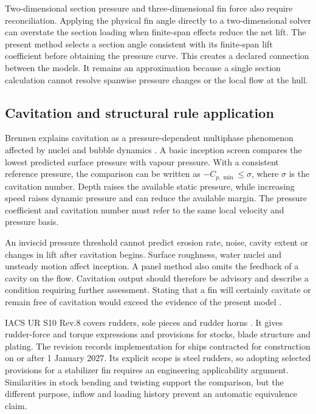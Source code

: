Two-dimensional section pressure and three-dimensional fin force also require reconciliation. Applying the physical fin angle directly to a two-dimensional solver can overstate the section loading when finite-span effects reduce the net lift. The present method selects a section angle consistent with its finite-span lift coefficient before obtaining the pressure curve. This creates a declared connection between the models. It remains an approximation because a single section calculation cannot resolve spanwise pressure changes or the local flow at the hull.

\subsection{Cavitation and structural rule application}
\label{sec:lit-cavitation-rules}

Brennen explains cavitation as a pressure-dependent multiphase phenomenon affected by nuclei and bubble dynamics \cite{brennen1995}. A basic inception screen compares the lowest predicted surface pressure with vapour pressure. With a consistent reference pressure, the comparison can be written as $-C_{p,\min}\leq\sigma$, where $\sigma$ is the cavitation number. Depth raises the available static pressure, while increasing speed raises dynamic pressure and can reduce the available margin. The pressure coefficient and cavitation number must refer to the same local velocity and pressure basis.

An inviscid pressure threshold cannot predict erosion rate, noise, cavity extent or changes in lift after cavitation begins. Surface roughness, water nuclei and unsteady motion affect inception. A panel method also omits the feedback of a cavity on the flow. Cavitation output should therefore be advisory and describe a condition requiring further assessment. Stating that a fin will certainly cavitate or remain free of cavitation would exceed the evidence of the present model \cite{brennen1995,molland2007}.

IACS UR S10 Rev.8 covers rudders, sole pieces and rudder horns \cite{iacsS10}. It gives rudder-force and torque expressions and provisions for stocks, blade structure and plating. The revision records implementation for ships contracted for construction on or after 1 January 2027. Its explicit scope is steel rudders, so adopting selected provisions for a stabilizer fin requires an engineering applicability argument. Similarities in stock bending and twisting support the comparison, but the different purpose, inflow and loading history prevent an automatic equivalence claim.

